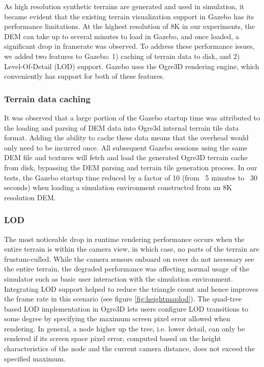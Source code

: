 \documentclass[twocolumn,letterpaper]{IEEEAerospaceCLS}  %
\begin{document}
As high resolution synthetic terrains are generated and used in simulation, it became evident that the existing terrain visualization support in Gazebo has its performance limitations. 
At the highest resolution of 8K in our experiments, the DEM can take up to several minutes to load in Gazebo, and once loaded, a significant drop in framerate was observed. 
To address these performance issues, we added two features to Gazebo: 1) caching of terrain data to disk, and 2) Level-Of-Detail (LOD) support. 
Gazebo uses the Ogre3D rendering engine, which conveniently has support for both of these features. 

\subsubsection{Terrain data caching}

It was observed that a large portion of the Gazebo startup time was attributed to the loading and parsing of DEM data into Ogre3d internal terrain tile data format. 
Adding the ability to cache these data means that the overhead would only need to be incurred once. 
All subsequent Gazebo sessions using the same DEM file and textures will fetch and load the generated Ogre3D terrain cache from disk, bypassing the DEM parsing and terrain tile generation process. 
In our tests, the Gazebo startup time reduced by a factor of 10 (from ~5 minutes to ~30 seconds) when loading a simulation environment constructed from an 8K resolution DEM.

\subsubsection{LOD}

The most noticeable drop in runtime rendering performance occurs when the entire terrain is within the camera view, in which case, no parts of the terrain are frustum-culled. 
While the camera sensors onboard on rover do not necessary see the entire terrain, the degraded performance was affecting normal usage of the simulator such as basic user interaction with the simulation environment. 
Integrating LOD support helped to reduce the triangle count and hence improves the frame rate in this scenario (see figure \ref{fig:heightmaplod}). 
The quad-tree based LOD implementation in Ogre3D lets users configure LOD transitions to some degree by specifying the maximum screen pixel error allowed when rendering. 
In general, a node higher up the tree, i.e. lower detail, can only be rendered if its screen space pixel error, computed based on the height characteristics of the node and the current camera distance, does not exceed the specified maximum. 
\end{document}
